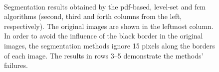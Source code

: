 \begin{figure}
\begin{center}
\
\
\end{center}
\caption[Segmentation results obtained by the \ac{pdf}-based, level-set and \ac{fcm} algorithms]{Segmentation results obtained by the \ac{pdf}-based, level-set and \ac{fcm} algorithms (second, third and forth columns from the left, respectively). The original images are shown in the leftmost column.
In order to avoid the influence of the black border in the original images, the segmentation methods ignore 15 pixels along the borders of each image.
The results in rows 3--5 demonstrate the methods' failures.}
\label{fig:plf}
\end{figure} 


